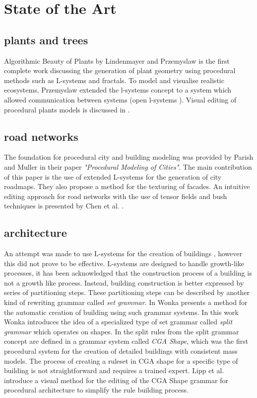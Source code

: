 
\chapter{State of the Art}
\label{sec:relatedwork}

\section{plants and trees}
Algorithmic Beauty of Plants by Lindenmayer and Przemyslaw \citep{PrzemyslawAlgoBeauty} is the first complete work discussing the generation of plant geometry using procedural methods such as L-systems and fractals. To model and visualise realistic ecosystems, Przemyslaw extended the l-systems concept to a system which allowed communication between systems (open l-systems \citep{PrzemyslawPlants} \citep{Deussen98}). Visual editing of procedural plants models is discussed in \citet{interactivebonsai}. 

\section{road networks}
The foundation for procedural city and building modeling was provided by Parish and Muller \citet{Parish01} in their paper \emph{"Procedural Modeling of Cities"}. The main contribution of this paper is the use of extended L-systems for the generation of city roadmaps. They also propose a method for the texturing of facades. An intuitive editing approach for road networks with the use of tensor fields and bush techniques is presented by Chen et al. \citet{Chen08}. 

\section{architecture}
An attempt was made to use L-systems for the creation of buildings \citet{Parish01}, however this did not prove to be effective. L-systems are designed to handle growth-like processes, it has been acknowledged that the construction process of a building is not a growth like process. Instead, building construction is better expressed by series of partitioning steps. These partitioning steps can be described by another kind of rewriting grammar called \emph{set grammar}. In \citet{Wonka03} Wonka presents a method for the automatic creation of building using such grammar systems. In this work Wonka introduces the idea of a specialized type of set grammar called \emph{split grammar} which operates on shapes. In \citet{Muller06} the split rules from the split grammar concept are defined in a grammar system called \emph{CGA Shape}, which was the first procedural system for the creation of detailed buildings with consistent mass 
models. The process of creating a ruleset in CGA shape for a specific type of building is not straightforward and requires a trained expert. Lipp et al. \citet{Lipp08} introduce a visual method for the editing of the CGA Shape grammar for procedural architecture to simplify the rule building process. 

